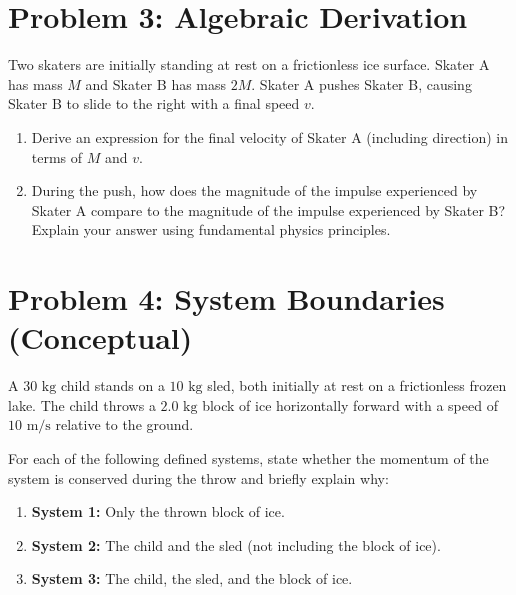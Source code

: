 \documentclass{article}
\begin{document}
\newpage

\section*{Problem 3: Algebraic Derivation}
Two skaters are initially standing at rest on a frictionless ice surface. Skater A has mass $M$ and Skater B has mass $2M$. Skater A pushes Skater B, causing Skater B to slide to the right with a final speed $v$.
\begin{enumerate}[label=(\alph*)]
    \item Derive an expression for the final velocity of Skater A (including direction) in terms of $M$ and $v$.
    \item During the push, how does the magnitude of the impulse experienced by Skater A compare to the magnitude of the impulse experienced by Skater B? Explain your answer using fundamental physics principles.
\end{enumerate}


\newpage

\section*{Problem 4: System Boundaries (Conceptual)}
A $30 \text{ kg}$ child stands on a $10 \text{ kg}$ sled, both initially at rest on a frictionless frozen lake. The child throws a $2.0 \text{ kg}$ block of ice horizontally forward with a speed of $10 \text{ m/s}$ relative to the ground. 

For each of the following defined systems, state whether the momentum of the system is conserved during the throw and briefly explain why:
\begin{enumerate}[label=(\alph*)]
    \item \textbf{System 1:} Only the thrown block of ice.
    \item \textbf{System 2:} The child and the sled (not including the block of ice).
    \item \textbf{System 3:} The child, the sled, and the block of ice.
\end{enumerate}
\newpage
\end{document}
